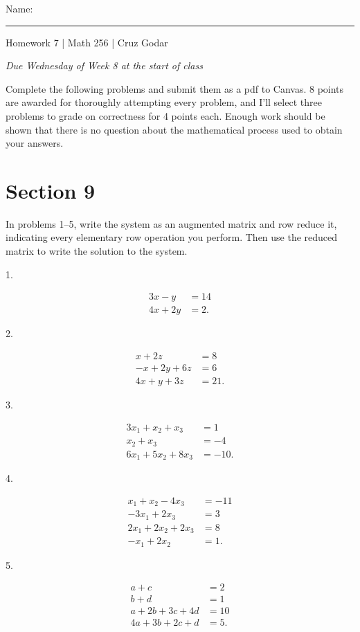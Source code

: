 \documentclass{article}
\begin{document}
\Large Name: \rule{2in}{0.15mm} \hfill Homework 7 | Math 256 | Cruz Godar \vspace{4pt} \normalsize

\textit{Due Wednesday of Week 8 at the start of class}

Complete the following problems and submit them as a pdf to Canvas. 8 points are awarded for thoroughly attempting every problem, and I'll select three problems to grade on correctness for 4 points each. Enough work should be shown that there is no question about the mathematical process used to obtain your answers.

\section{Section 9}

In problems 1--5, write the system as an augmented matrix and row reduce it, indicating every elementary row operation you perform. Then use the reduced matrix to write the solution to the system.

1.

\begin{align*}
	3x - y &= 14\\
	4x + 2y &= 2.
\end{align*}

2.

\begin{align*}
	x + 2z &= 8\\
	-x + 2y + 6z &= 6\\
	4x + y + 3z &= 21.
\end{align*}

3.

\begin{align*}
	3x_1 + x_2 + x_3 &= 1\\
	x_2 + x_3 &= -4\\
	6x_1 + 5x_2 + 8x_3 &= -10.
\end{align*}

4.

\begin{align*}
	x_1 + x_2 - 4x_3 &= -11\\
	-3x_1 + 2x_3 &= 3\\
	2x_1 + 2x_2 + 2x_3 &= 8\\
	-x_1 + 2x_2 &= 1.
\end{align*}

5.

\begin{align*}
	a + c &= 2\\
	b + d &= 1\\
	a + 2b + 3c + 4d &= 10\\
	4a + 3b + 2c + d &= 5.
\end{align*}
\end{document}
